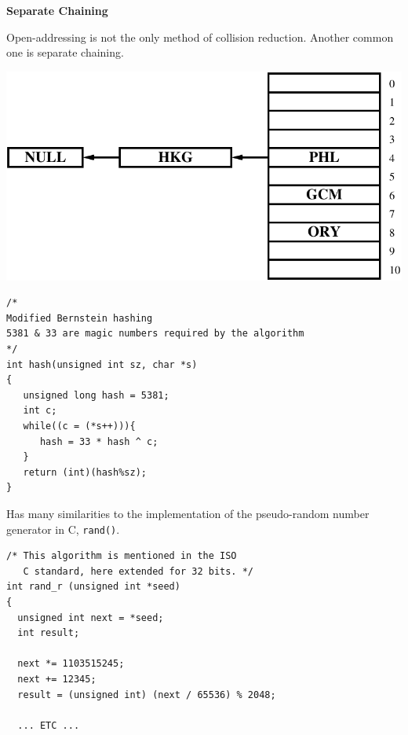 \documentclass[a4,portraitt]{slides}
\begin{document}
\newpage
{\samepage
\begin{center}
{\Large{\bf Separate Chaining}}
\end{center}
Open-addressing is not the only method of collision reduction. Another common
one is separate chaining.
\begin{center}
\includegraphics{../Images/hashsep.pdf}
\end{center}
}

\newpage
{\small
\begin{verbatim}
/*
Modified Bernstein hashing
5381 & 33 are magic numbers required by the algorithm
*/
int hash(unsigned int sz, char *s)
{
   unsigned long hash = 5381;
   int c;
   while((c = (*s++))){
      hash = 33 * hash ^ c;
   }
   return (int)(hash%sz);
}
\end{verbatim}

Has many similarities to the implementation of the pseudo-random number generator in C, \verb^rand()^.
{\small
\begin{verbatim}
/* This algorithm is mentioned in the ISO
   C standard, here extended for 32 bits. */
int rand_r (unsigned int *seed)
{
  unsigned int next = *seed;
  int result;

  next *= 1103515245;
  next += 12345;
  result = (unsigned int) (next / 65536) % 2048;

  ... ETC ...
\end{verbatim}
}
}
\end{document}
